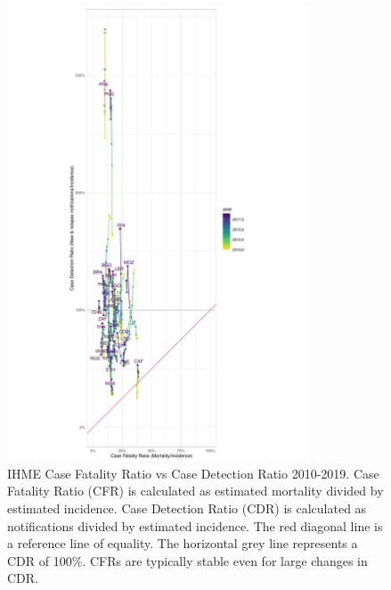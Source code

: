 \documentclass[12pt]{article}
\begin{document}
\FloatBarrier


\begin{figure}
  \centering
  \includegraphics[width=0.8\textwidth]{../plots/aF8.pdf}
  \caption[Case Fatality Ratio vs Case Detection Ratio]{IHME Case Fatality Ratio vs
    Case Detection Ratio 2010-2019. Case Fatality Ratio (CFR) is calculated as estimated
    mortality divided by estimated incidence.
    Case Detection Ratio (CDR) is calculated as notifications divided by
    estimated incidence. The red diagonal line is a reference line of equality.
    The horizontal grey line represents a CDR of 100\%. CFRs are typically
    stable even for large changes in CDR.}
\end{figure}

\FloatBarrier
\end{document}
